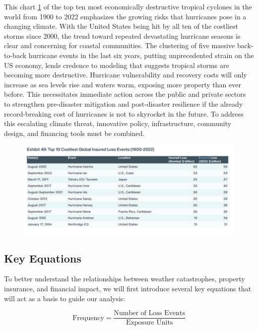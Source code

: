 \documentclass[12pt]{article}
\begin{document}
This chart \ref{fig:10global_loss} of the top ten most economically destructive tropical cyclones in the world from 1900 to 2022 emphasizes the growing risks 
that hurricanes pose in a changing climate. With the United States being hit by all ten of the costliest storms since 2000, the trend 
toward repeated devastating hurricane seasons is clear and concerning for coastal communities. The clustering of five massive 
back-to-back hurricane events in the last six years, putting unprecedented strain on the US economy, lends credence to modeling that 
suggests tropical storms are becoming more destructive. Hurricane vulnerability and recovery costs will only increase as sea levels 
rise and waters warm, exposing more property than ever before.  This necessitates immediate action across the public and private 
sectors to strengthen pre-disaster mitigation and post-disaster resilience if the already record-breaking cost of hurricanes is not 
to skyrocket in the future. To address this escalating climate threat, innovative policy, infrastructure, community design, and 
financing tools must be combined.

\begin{figure}[ht]
    \centering
    \includegraphics[width=0.8\linewidth]{AON Top 10 Global Insured Loss Events.pdf}
    \label{fig:10global_loss}
    \cite{aon}
\end{figure}



\subsection{Key Equations}

To better understand the relationships between weather catastrophes, property insurance, and financial impact, we will first introduce 
several key equations that will act as a basis to guide our analysis:

\begin{equation}
    \label{eq:freq}
    \text{Frequency} = \frac{\text{Number of Loss Events}}{\text{Exposure Units}}
\end{equation}
\end{document}
